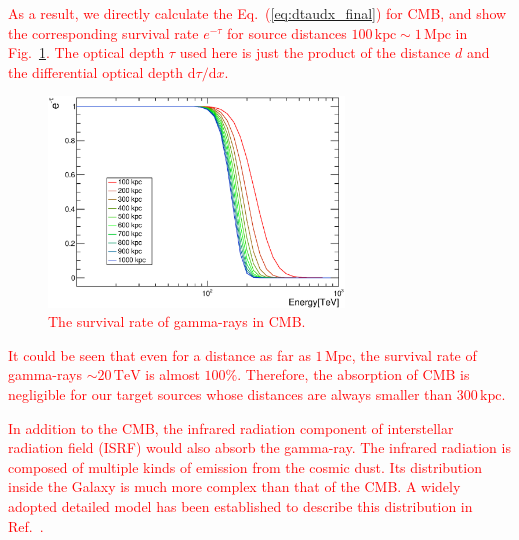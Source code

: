 \documentclass[12pt,aps,prd,amsmath,amssymb,showpacs,floats,floatfix,nofootinbib]{revtex4-1}
\def\red#1{{\textcolor{red}{#1}}} %
\def\TeV{\mathrm{TeV}} %
\def\kpc{\mathrm{kpc}} %
\def\Mpc{\mathrm{Mpc}} %
\begin{document}
\red{
As a result, we directly calculate the Eq.~(\ref{eq:dtaudx_final}) for CMB, and show the corresponding survival rate $e^{-\tau}$ for source distances $100\,\kpc\sim1\,\Mpc$ in Fig.~\ref{fig:opacity}.
The optical depth $\tau$ used here is just the product of the distance $d$ and the differential optical depth $\mathrm{d}\tau/\mathrm{d}x$.
\begin{figure}[!htpb]
  \centering
  \includegraphics[width=0.7\textwidth]{opacity.eps}
  \caption{The survival rate of gamma-rays in CMB.}
  \label{fig:opacity}
\end{figure}
It could be seen that even for a distance as far as $1\,\Mpc$, the survival rate of gamma-rays $\sim20\,\TeV$ is almost $100\%$.
Therefore, the absorption of CMB is negligible for our target sources whose distances are always smaller than $300\,\kpc$.
%  
}

\red{
  In addition to the CMB, the infrared radiation component of interstellar radiation field (ISRF) would also absorb the gamma-ray.
  The infrared radiation is composed of multiple kinds of emission from the cosmic dust.
  Its distribution inside the Galaxy is much more complex than that of the CMB.
  A widely adopted detailed model has been established to describe this distribution in Ref.~\cite{Strong:1998fr}.
}
\end{document}
